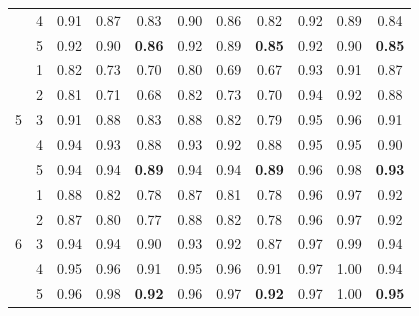 \documentclass[12pt]{article}
\begin{document}
\begin{table}[H]
\begin{tabular}{rrrrrrrrrrr}
            \multicolumn{1}{c}{} & \multicolumn{1}{c}{4}& 0.91 & 0.87 & \multicolumn{1}{c}{0.83} & 0.90 & 0.86 & \multicolumn{1}{c}{0.82} & 0.92 & 0.89 & \multicolumn{1}{c}{0.84}   \\
            \multicolumn{1}{c}{} & \multicolumn{1}{c}{5}& 0.92 & 0.90 & \multicolumn{1}{c}{\textbf{0.86}} & 0.92 & 0.89 & \multicolumn{1}{c}{\textbf{0.85}} & 0.92 & 0.90 & \multicolumn{1}{c}{\textbf{0.85}} \\
            \hline
            \multicolumn{1}{c}{\multirow{5}{*}{5}} & \multicolumn{1}{c}{1}& 0.82 & 0.73 & \multicolumn{1}{c}{0.70} & 0.80 & 0.69 & \multicolumn{1}{c}{0.67} & 0.93 & 0.91 & \multicolumn{1}{c}{0.87} \\
            \multicolumn{1}{c}{} & \multicolumn{1}{c}{2}& 0.81 & 0.71 & \multicolumn{1}{c}{0.68} & 0.82 & 0.73 & \multicolumn{1}{c}{0.70} & 0.94 & 0.92 & \multicolumn{1}{c}{0.88} \\
            \multicolumn{1}{c}{} & \multicolumn{1}{c}{3}& 0.91 & 0.88 & \multicolumn{1}{c}{0.83} & 0.88 & 0.82 & \multicolumn{1}{c}{0.79} & 0.95 & 0.96 & \multicolumn{1}{c}{0.91} \\
            \multicolumn{1}{c}{} & \multicolumn{1}{c}{4}& 0.94 & 0.93 & \multicolumn{1}{c}{0.88} & 0.93 & 0.92 & \multicolumn{1}{c}{0.88} & 0.95 & 0.95 & \multicolumn{1}{c}{0.90}  \\
            \multicolumn{1}{c}{} & \multicolumn{1}{c}{5}& 0.94 & 0.94 & \multicolumn{1}{c}{\textbf{0.89}} & 0.94 & 0.94 & \multicolumn{1}{c}{\textbf{0.89}} & 0.96 & 0.98 & \multicolumn{1}{c}{\textbf{0.93}}  \\
            \hline
            \multicolumn{1}{c}{\multirow{5}{*}{6}} & \multicolumn{1}{c}{1}& 0.88 & 0.82 & \multicolumn{1}{c}{0.78} & 0.87 & 0.81 & \multicolumn{1}{c}{0.78} & 0.96 & 0.97 & \multicolumn{1}{c}{0.92}  \\
            \multicolumn{1}{c}{} & \multicolumn{1}{c}{2}& 0.87 & 0.80 & \multicolumn{1}{c}{0.77} & 0.88 & 0.82 & \multicolumn{1}{c}{0.78} & 0.96 & 0.97 & \multicolumn{1}{c}{0.92}  \\
            \multicolumn{1}{c}{} & \multicolumn{1}{c}{3}& 0.94 & 0.94 & \multicolumn{1}{c}{0.90} & 0.93 & 0.92 & \multicolumn{1}{c}{0.87}  & 0.97 & 0.99 & \multicolumn{1}{c}{0.94} \\
            \multicolumn{1}{c}{} & \multicolumn{1}{c}{4}& 0.95 & 0.96 & \multicolumn{1}{c}{0.91} & 0.95 & 0.96 & \multicolumn{1}{c}{0.91} & 0.97 & 1.00 & \multicolumn{1}{c}{0.94}   \\
            \multicolumn{1}{c}{} & \multicolumn{1}{c}{5}& 0.96 & 0.98 & \multicolumn{1}{c}{\textbf{0.92}} & 0.96 & 0.97 & \multicolumn{1}{c}{\textbf{0.92}} & 0.97 & 1.00 & \multicolumn{1}{c}{\textbf{0.95}}  \\

\end{tabular}
\end{table}
\end{document}
